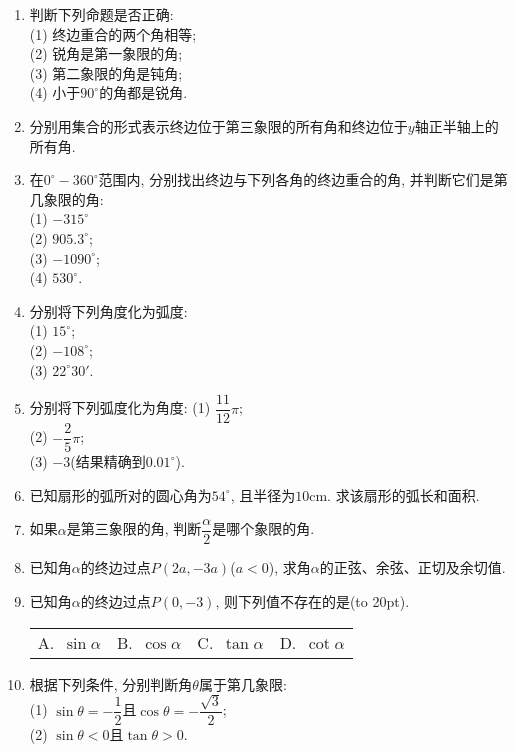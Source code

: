 \documentclass[10pt,a4paper]{article}
\newcommand{\bracket}[1]{(\hbox to #1pt{})}
\newcommand{\fourch}[4]{\par\begin{tabular}{p{.23\textwidth}p{.23\textwidth}p{.23\textwidth}p{.23\textwidth}}
A.~#1 &B.~#2& C.~#3& D.~#4
\end{tabular}}
\begin{document}
\begin{enumerate}[1.]
\item 判断下列命题是否正确:\\
(1) 终边重合的两个角相等;\\
(2) 锐角是第一象限的角;\\
(3) 第二象限的角是钝角;\\
(4) 小于$90^\circ$的角都是锐角.
\item 分别用集合的形式表示终边位于第三象限的所有角和终边位于$y$轴正半轴上的所有角.
\item 在$0^\circ-360^\circ$范围内, 分别找出终边与下列各角的终边重合的角, 并判断它们是第几象限的角:\\
(1) $-315^\circ$\\
(2) $905.3^\circ$;\\
(3) $-1090^\circ$;\\
(4) $530^\circ$.
\item 分别将下列角度化为弧度:\\
(1) $15^\circ$;\\
(2) $-108^\circ$;\\
(3) $22^\circ 30'$.
\item 分别将下列弧度化为角度:
(1) $\dfrac{11}{12}\pi$;\\
(2) $-\dfrac 25\pi$;\\
(3) $-3$(结果精确到$0.01^\circ$).
\item 已知扇形的弧所对的圆心角为$54^\circ$, 且半径为$10\text{cm}$. 求该扇形的弧长和面积.
\item 如果$\alpha$是第三象限的角, 判断$\dfrac\alpha 2$是哪个象限的角.
\item 已知角$\alpha$的终边过点$P(2a, -3a)$($a<0$), 求角$\alpha$的正弦、余弦、正切及余切值.
\item 已知角$\alpha$的终边过点$P(0, -3)$, 则下列值不存在的是\bracket{20}.
\fourch{$\sin \alpha$}{$\cos \alpha$}{$\tan \alpha$}{$\cot \alpha$}
\item 根据下列条件, 分别判断角$\theta$属于第几象限:\\
(1) $\sin \theta =-\dfrac 12$且$\cos \theta =-\dfrac{\sqrt 3}2$;\\
(2) $\sin \theta <0$且$\tan \theta >0$.

\end{enumerate}
\end{document}
